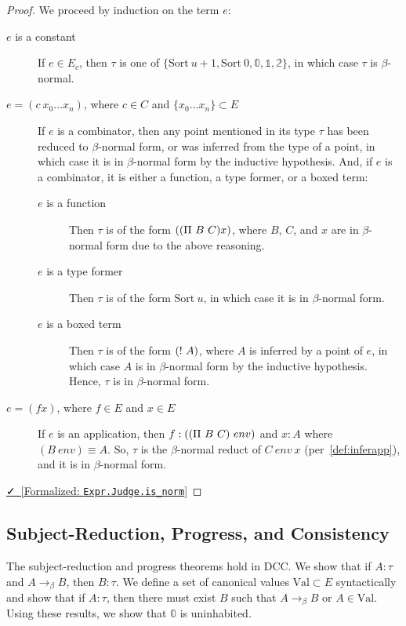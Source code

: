 \documentclass{lmcs}
\newcommand{\val}{\text{Val}}
\newcommand{\leanlink}[2]{
  \href{#1}{\textcolor{black}\faCheck~[Formalized: \texttt{#2}]}%
}
\newcommand{\arr}{\rightarrow}
\newcommand{\sort}[1]{\text{Sort}\ #1}
\newcommand{\barr}{\arr_{\beta}}
\begin{document}
\begin{proof}
  We proceed by induction on the term \(e\):
  \begin{description}
    \item[\(e\) is a constant] If \(e \in E_c\), then \(\tau\) is one of \(\{\sort{u + 1}, \sort{0}, \mathbb{0}, \mathbb{1}, \mathbb{2}\}\), in which case \(\tau\) is \(\beta\)-normal.
    \item[\(e = (c\ x_0 \ldots x_n)\), where \(c \in C\) and \(\{x_0 \ldots x_n\} \subset E\)] If \(e\) is a combinator, then any point mentioned in its type \(\tau\) has been reduced to \(\beta\)-normal form, or was inferred from the type of a point, in which case it is in \(\beta\)-normal form by the inductive hypothesis. And, if \(e\) is a combinator, it is either a function, a type former, or a boxed term:
      \begin{description}
        \item[\(e\) is a function] Then \(\tau\) is of the form \((\comb[\Pi][B][C] x)\), where \(B\), \(C\), and \(x\) are in \(\beta\)-normal form due to the above reasoning.
        \item[\(e\) is a type former] Then \(\tau\) is of the form \(\sort{u}\), in which case it is in \(\beta\)-normal form.
        \item[\(e\) is a boxed term] Then \(\tau\) is of the form \(\comb[!][A]\), where \(A\) is inferred by a point of \(e\), in which case \(A\) is in \(\beta\)-normal form by the inductive hypothesis. Hence, \(\tau\) is in \(\beta\)-normal form.
        \end{description}
    \item[\(e = (f x)\), where \(f \in E\) and \(x \in E\)] If \(e\) is an application, then \(f : (\comb[\Pi][B][C]\ env)\) and \(x : A\) where \((B\ env) \equiv A\). So, \(\tau\) is the \(\beta\)-normal reduct of \(C\ env\ x\) (per~\ref{def:inferapp}), and it is in \(\beta\)-normal form.
  \end{description}
  \noindent \leanlink{https://github.com/lexzaiello/DCC/blob/fb7acf6d9644df7d13c809d12609b59eaca5c763/Dcc/Metatheory/Decidability.lean\#L143}{Expr.Judge.is\_norm}
\end{proof}

\subsection{Subject-Reduction, Progress, and Consistency}\label{otherthmsjudge}

The subject-reduction and progress theorems hold in DCC. We show that if \(A : \tau\) and \(A \barr B\), then \(B : \tau\). We define a set of canonical values \(\val \subset E\) syntactically and show that if \(A : \tau\), then there must exist \(B\) such that \(A \barr B\) or \(A \in \val\). Using these results, we show that \(\mathbb{0}\) is uninhabited.
\end{document}
